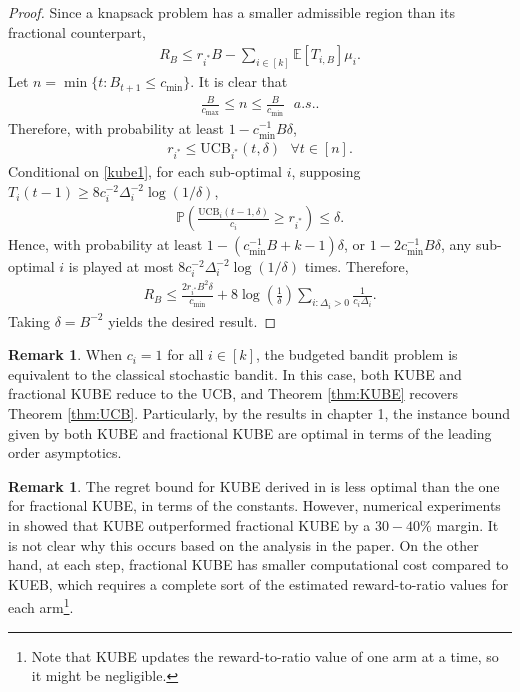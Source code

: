 \documentclass[10pt,a4article]{article}
\numberwithin{equation}{section}
\theoremstyle{plain}
\theoremstyle{definition}
\newtheorem{Rem}[Th]{Remark}
\def\E{{\mathbb E}}
\def\P{{\mathbb P}}
\begin{document}
\begin{proof}
Since a knapsack problem has a smaller admissible region than its fractional counterpart, 
\begin{align*}
R_B\leq r_{i^*}B-\sum_{i\in [k]}\E[T_{i,B}]\mu_i.
\end{align*}
Let $n = \min\{t: B_{t+1}\leq c_{\min}\}$.  
It is clear that 
\begin{align*}
\frac{B}{c_{\max}}\leq n\leq\frac{B}{c_{\min}}\ \ \ a.s.. 
\end{align*}
Therefore, with probability at least $1-c_{\min}^{-1}B\delta$, 
\begin{align}
r_{i^*}\leq \text{UCB}_{i^*}(t, \delta)\ \ \ \forall t\in [n]. \label{kube1}
\end{align}
Conditional on \eqref{kube1}, for each sub-optimal $i$, supposing $T_i(t-1)\geq 8c_i^{-2}\Delta_i^{-2}\log(1/\delta)$, 
\begin{align*}
\P\left(\frac{\text{UCB}_i(t-1, \delta)}{c_i}\geq r_{i^*}\right)\leq\delta. 
\end{align*}
Hence, with probability at least $1-(c_{\min}^{-1}B+k-1)\delta$, or $1-2c_{\min}^{-1}B\delta$, any sub-optimal $i$ is played at most $8c_i^{-2}\Delta_i^{-2}\log(1/\delta)$ times. Therefore, 
\begin{align*}
R_B\leq\frac{2r_{i^*}B^2\delta}{c_{\min}}+8\log\left(\frac{1}{\delta}\right)\sum_{i: \Delta_i>0}\frac{1}{c_i\Delta_i}.
\end{align*}
Taking $\delta = B^{-2}$ yields the desired result.
\end{proof}

\begin{Rem}
When $c_i=1$ for all $i\in [k]$, the budgeted bandit problem is equivalent to the classical stochastic bandit. In this case, both KUBE and fractional KUBE reduce to the UCB, and Theorem \ref{thm:KUBE} recovers Theorem \ref{thm:UCB}. Particularly, by the results in chapter 1, the instance bound given by both KUBE and fractional KUBE are optimal in terms of the leading order asymptotics. 
\end{Rem}

\begin{Rem}
The regret bound for KUBE derived in \cite{tran2012knapsack} is less optimal than the one for fractional KUBE, in terms of the constants. However, numerical experiments in \cite{tran2012knapsack} showed that KUBE outperformed fractional KUBE by a $30-40\%$ margin. It is not clear why this occurs based on the analysis in the paper. On the other hand, at each step, fractional KUBE has smaller computational cost compared to KUEB, which requires a complete sort of the estimated reward-to-ratio values for each arm\footnote{Note that KUBE updates the reward-to-ratio value of one arm at a time, so it might be negligible.}. 
\end{Rem}
\end{document}
